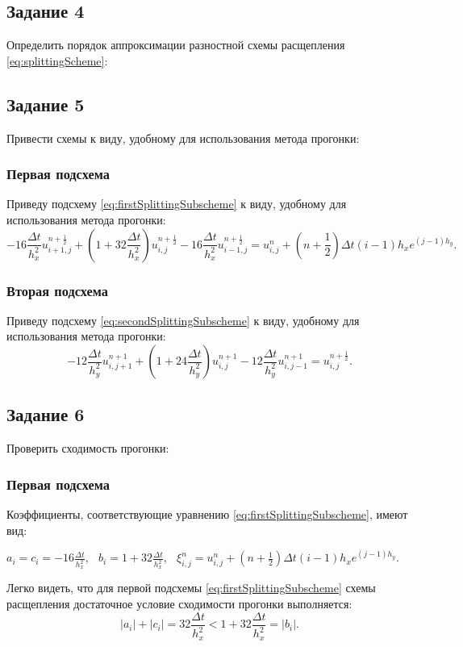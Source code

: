 \documentclass[12pt, a4paper]{report}
\begin{document}
	\subsection*{Задание 4}
	\large
	Определить порядок аппроксимации разностной схемы расщепления \eqref{eq:splittingScheme}:

	\subsection*{Задание 5}
	\large
	Привести схемы к виду, удобному для использования метода прогонки: \par
	\subsubsection*{Первая подсхема}
	\large
	Приведу подсхему \eqref{eq:firstSplittingSubscheme} к виду, удобному для использования метода прогонки:
	\small
	\begin{equation*}
		-16\frac{\Delta t}{h_{x}^{2}}u_{i+1, j}^{n+\frac{1}{2}} + (1 + 32\frac{\Delta t}{h_{x}^{2}})u_{i, j}^{n+\frac{1}{2}} - 16\frac{\Delta t}{h_{x}^{2}}u_{i-1, j}^{n+\frac{1}{2}} = u_{i, j}^{n} + (n + \frac{1}{2})\Delta t(i-1)h_{x}e^{(j-1)h_{y}}.
	\end{equation*}
	\subsubsection*{Вторая подсхема}
	\large
	Приведу подсхему \eqref{eq:secondSplittingSubscheme} к виду, удобному для использования метода прогонки:
	\begin{equation*}
		-12\frac{\Delta t}{h_{y}^{2}}u_{i, j+1}^{n+1} + (1 + 24\frac{\Delta t}{h_{y}^{2}})u_{i, j}^{n+1} - 12\frac{\Delta t}{h_{y}^{2}}u_{i, j-1}^{n+1} = u_{i, j}^{n+\frac{1}{2}}.
	\end{equation*}

	\subsection*{Задание 6}
	\large
	Проверить сходимость прогонки:
	\subsubsection*{Первая подсхема}
	\large
	Коэффициенты, соответствующие уравнению \eqref{eq:firstSplittingSubscheme}, имеют вид:
	\small
	\begin{center}
		$a_{i}=c_{i}=-16\frac{\Delta t}{h_{x}^{2}}$, $\>$ $b_{i}=1 + 32\frac{\Delta t}{h_{x}^{2}}$, $\>$ $\xi_{i, j}^{n}=u_{i, j}^{n} + (n + \frac{1}{2})\Delta t(i-1)h_{x}e^{(j-1)h_{y}}$.
	\end{center}
	\par
	\large
	Легко видеть, что для первой подсхемы \eqref{eq:firstSplittingSubscheme} схемы расщепления достаточное условие сходимости прогонки выполняется:
	\begin{equation*}
		\lvert a_{i} \rvert + \lvert c_{i} \rvert = 32\frac{\Delta t}{h_{x}^{2}} < 1 + 32\frac{\Delta t}{h_{x}^{2}} = \lvert b_{i} \rvert.
	\end{equation*}
\end{document}
